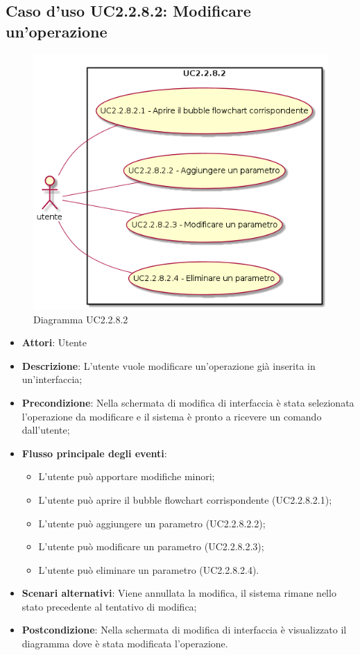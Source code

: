 \documentclass[../AnalisiDeiRequisiti.tex]{subfiles}
\begin{document}
			\subsection{Caso d'uso UC2.2.8.2: Modificare un'operazione}
			\begin{figure} [H]
				\centering
				\includegraphics[scale=0.45]{./Figures/UC2-2-8-2.png}
				\caption{Diagramma UC2.2.8.2}\label{}
			\end{figure}
			\begin{itemize}
				\item \textbf{Attori}: Utente
				\item \textbf{Descrizione}: L'utente vuole modificare un'operazione già inserita in un'interfaccia;
				\item \textbf{Precondizione}: Nella schermata di modifica di interfaccia è stata selezionata l'operazione da modificare e il sistema è pronto a ricevere un comando dall'utente;
				\item \textbf{Flusso principale degli eventi}: \begin{itemize}
					\item L'utente può apportare modifiche minori;
					\item L'utente può aprire il bubble flowchart corrispondente (UC2.2.8.2.1);
					\item L'utente può aggiungere un parametro (UC2.2.8.2.2);
					\item L'utente può modificare un parametro (UC2.2.8.2.3);
					\item L'utente può eliminare un parametro (UC2.2.8.2.4).
				\end{itemize}
				\item \textbf{Scenari alternativi}: Viene annullata la modifica, il sistema rimane nello stato precedente al tentativo di modifica;
				\item \textbf{Postcondizione}: Nella schermata di modifica di interfaccia è visualizzato il diagramma dove è stata modificata l'operazione.
			\end{itemize}
\end{document}
